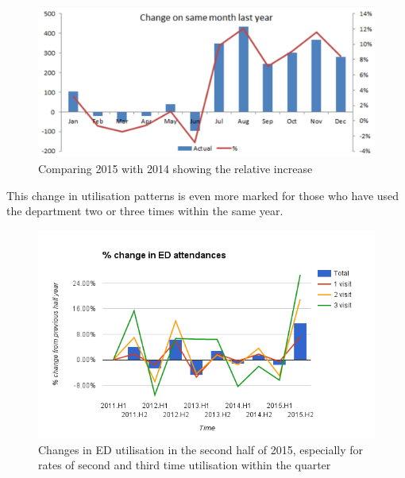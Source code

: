 \documentclass[11pt,a4paper]{article}
\begin{document}
\begin{figure}[htp]
\centering
\includegraphics[scale=0.35]{ED.png}
\caption{Comparing 2015 with 2014 showing the relative increase}
\label{Relative changes in ED utilization}
\end{figure}


This change in utilisation patterns is even more marked for those who have used the department two or three times within the same year.\\


\begin{figure}[htp]
\centering
\includegraphics[scale=0.70]{Fchange.png}
\caption{Changes in ED utilisation in the second half of 2015, especially for rates of second and third time utilisation within the quarter}
\label{Changes in ED utilisation}
\end{figure}
\end{document}
